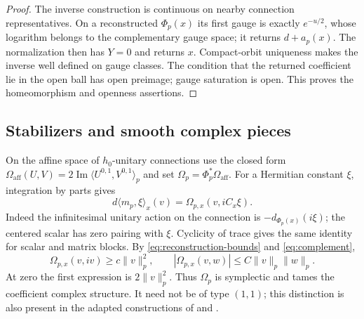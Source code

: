 \documentclass[11pt]{amsart}
\theoremstyle{definition}
\theoremstyle{remark}
\begin{document}
\begin{proof}
The inverse construction is continuous on nearby connection representatives.
On a reconstructed $\Phi_p(x)$ its first gauge is exactly $e^{-u/2}$,
whose logarithm belongs to the complementary gauge space; it returns
$d+a_p(x)$. The normalization then has $Y=0$ and returns $x$.
Compact-orbit uniqueness makes the inverse well defined on gauge
classes. The condition that the returned coefficient lie in the open
ball has open preimage; gauge saturation is open. This proves the
homeomorphism and openness assertions.
\end{proof}

\subsection{Stabilizers and smooth complex pieces}
On the affine space of $h_0$-unitary connections use the closed form
$\Omega_{\mathrm{aff}}(U,V)=2\operatorname{Im}
\langle U^{0,1},V^{0,1}\rangle_p$ and set
$\Omega_p=\Phi_p^*\Omega_{\mathrm{aff}}$.
For a Hermitian constant $\xi$, integration by parts gives
\begin{equation}\label{eq:moment-identity}
 d\langle m_p,\xi\rangle_x(v)
       =\Omega_{p,x}(v,iC_x\xi).
\end{equation}
Indeed the infinitesimal unitary action on the connection is
$-d_{\Phi_p(x)}(i\xi)$; the centered scalar has zero pairing with
$\xi$. Cyclicity of trace gives the same identity for scalar and
matrix blocks. By \eqref{eq:reconstruction-bounds} and
\eqref{eq:complement},
\begin{equation}\label{eq:taming}
 \Omega_{p,x}(v,iv)\ge c\|v\|_p^2,
 \qquad |\Omega_{p,x}(v,w)|\le C\|v\|_p\|w\|_p.
\end{equation}
At zero the first expression is $2\|v\|_p^2$. Thus $\Omega_p$ is
symplectic and tames the coefficient complex structure. It need not
be of type $(1,1)$; this distinction is also present in the adapted
constructions of \cite[Section 3]{ClarkeTipler24} and
\cite[Section 4.1]{Delloque25}.
\end{document}
